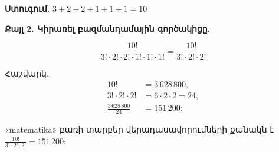 \documentclass[12pt, a4paper]{article}
\begin{document}
\textbf{Ստուգում.}\; $3 + 2 + 2 + 1 + 1 + 1 = 10$ \;\checkmark

\medskip
\textbf{Քայլ 2. Կիրառել բազմանդամային գործակիցը.}

\[
  \frac{10!}{3!\cdot 2!\cdot 2!\cdot 1!\cdot 1!\cdot 1!}
  = \frac{10!}{3!\cdot 2!\cdot 2!}
\]

Հաշվարկ․
\begin{align*}
  10! &= 3\,628\,800, \\
  3! \cdot 2! \cdot 2! &= 6 \cdot 2 \cdot 2 = 24, \\[4pt]
  \frac{3\,628\,800}{24} &= 151\,200 \text{։}
\end{align*}

\begin{answerbox}
\centering
«matematika» բառի տարբեր վերադասավորումների քանակն է
$\displaystyle\frac{10!}{3!\cdot 2!\cdot 2!} = \boxed{151\,200}$։
\end{answerbox}
\end{document}
